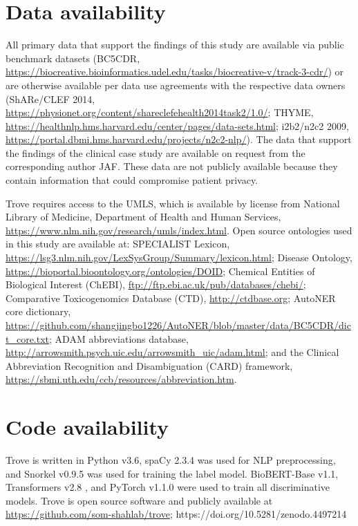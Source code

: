 \documentclass{article}
\begin{document}
\section*{Data availability}
{
All primary data that support the findings of this study are available via public benchmark datasets (BC5CDR, \url{https://biocreative.bioinformatics.udel.edu/tasks/biocreative-v/track-3-cdr/}) or are otherwise available per data use agreements with the respective data owners (ShARe/CLEF 2014, \url{https://physionet.org/content/shareclefehealth2014task2/1.0/}; THYME, \url{https://healthnlp.hms.harvard.edu/center/pages/data-sets.html}; i2b2/n2c2 2009, \url{https://portal.dbmi.hms.harvard.edu/projects/n2c2-nlp/}).
The data that support the findings of the clinical case study are available on request from the corresponding author JAF. 
These data are not publicly available because they contain information that could compromise patient privacy.}

{
Trove requires access to the UMLS, which is available by license from National Library of Medicine, Department of Health and Human Services, \url{https://www.nlm.nih.gov/research/umls/index.html}.
Open source ontologies used in this study are available at: SPECIALIST Lexicon, \url{https://lsg3.nlm.nih.gov/LexSysGroup/Summary/lexicon.html}; 
Disease Ontology, \url{https://bioportal.bioontology.org/ontologies/DOID};
Chemical Entities of Biological Interest (ChEBI), \url{ftp://ftp.ebi.ac.uk/pub/databases/chebi/};
Comparative Toxicogenomics Database (CTD), \url{http://ctdbase.org};
AutoNER core dictionary, \url{https://github.com/shangjingbo1226/AutoNER/blob/master/data/BC5CDR/dict_core.txt};
ADAM abbreviations database, \url{http://arrowsmith.psych.uic.edu/arrowsmith_uic/adam.html}; and the Clinical Abbreviation Recognition and Disambiguation (CARD) framework, \url{https://sbmi.uth.edu/ccb/resources/abbreviation.htm}.}


\section*{Code availability}
Trove is written in Python v3.6, {spaCy 2.3.4 was used for NLP preprocessing, and} Snorkel v0.9.5 was used for training the label model. 
BioBERT-Base v1.1, Transformers v2.8 \cite{Wolf2019-kd}, and PyTorch v1.1.0 were used to train all discriminative models. 
Trove is open source software and publicly available at \url{https://github.com/som-shahlab/trove}; {https://doi.org/10.5281/zenodo.4497214} \cite{fries-trove}
\end{document}
